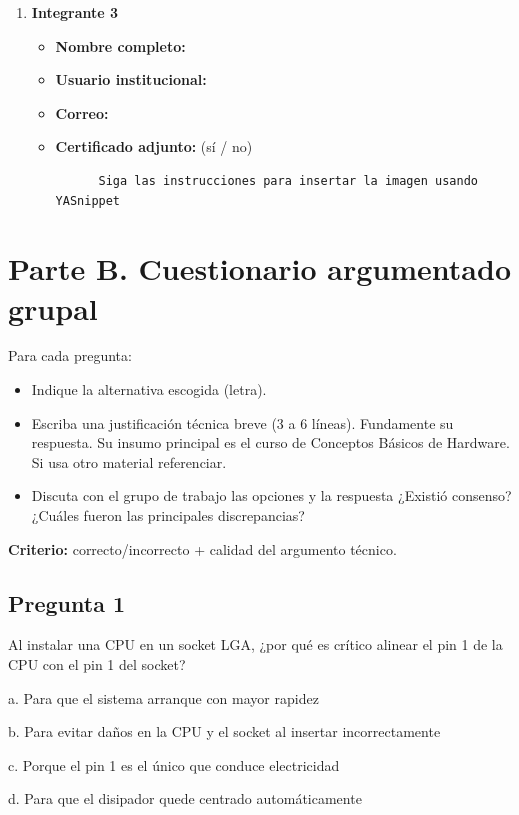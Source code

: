 \documentclass{article}
\begin{document}
\begin{enumerate}
\item \textbf{Integrante 3}
\begin{itemize}
\item \textbf{Nombre completo:}
\item \textbf{Usuario institucional:}
\item \textbf{Correo:}
\item \textbf{Certificado adjunto:} (sí / no)
\begin{verbatim}
      Siga las instrucciones para insertar la imagen usando YASnippet
\end{verbatim}
\end{itemize}
\end{enumerate}

\section{Parte B. Cuestionario argumentado grupal}
\label{sec:org652e82c}

Para cada pregunta:

\begin{itemize}
\item Indique la alternativa escogida (letra).
\item Escriba una justificación técnica breve (3 a 6 líneas). Fundamente
su respuesta. Su insumo principal es el curso de Conceptos Básicos
de Hardware. Si usa otro material referenciar.
\item Discuta con el grupo de trabajo las opciones y la respuesta ¿Existió
consenso? ¿Cuáles fueron las principales discrepancias?
\end{itemize}

\textbf{Criterio:} correcto/incorrecto + calidad del argumento técnico.

\subsection{Pregunta 1}
\label{sec:org0712e54}
Al instalar una CPU en un socket LGA, ¿por qué es crítico alinear el
pin 1 de la CPU con el pin 1 del socket?

a. Para que el sistema arranque con mayor rapidez 

b. Para evitar daños en la CPU y el socket al insertar incorrectamente

c. Porque el pin 1 es el único que conduce electricidad 

d. Para que el disipador quede centrado automáticamente
\end{document}
